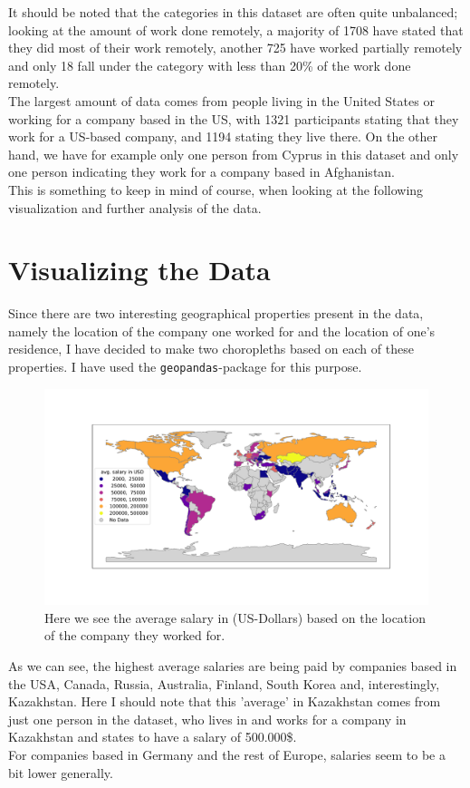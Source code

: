 \documentclass{article}
\begin{document}
It should be noted that the categories in this dataset are often quite unbalanced; looking at the amount of work done remotely, a majority of 1708 have stated that they did most of their work remotely, another 725 have worked partially remotely and only 18 fall under the category with 
less than 20\% of the work done remotely. \\
The largest amount of data comes from people living in the United States or working for a company based in the US, with 1321 participants stating that they work for a US-based company, and 1194 stating they live there. On the other hand, we have for example only one person from Cyprus in this dataset and only one person indicating they work for a company based in Afghanistan. \\
This is something to keep in mind of course, when looking at the following visualization and further analysis of the data. 

\section{Visualizing the Data}
Since there are two interesting geographical properties present in the data, namely the location of the company one worked for and the location of one's residence, I have decided to make two choropleths based on each of these properties. I have used the \texttt{geopandas}-package \citep{kelsey_jordahl_2021_5573592} for this purpose.

\begin{figure}[h!]
  \centering
  \includegraphics[scale=0.38]{fig/salaries_company_loc.pdf}
  \caption{Here we see the average salary in (US-Dollars) based on the location of the company they worked for.}
\end{figure}

As we can see, the highest average salaries are being paid by companies based in the USA, Canada, Russia, Australia, Finland, South Korea and, interestingly, Kazakhstan. Here I should note that this 'average' in Kazakhstan comes from just one person in the dataset, who lives in and works for a company in Kazakhstan and states to have a salary of 500.000\$. \\
For companies based in Germany and the rest of Europe, salaries seem to be a bit lower generally.
\end{document}
